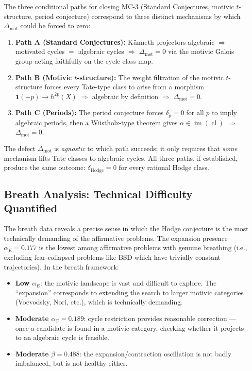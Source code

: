 \documentclass[11pt]{article}
\theoremstyle{definition}
\DeclareMathOperator{\cl}{cl}
\DeclareMathOperator{\im}{im}
\begin{document}
The three conditional paths for closing MC-3 (Standard Conjectures,
motivic $t$-structure, period conjecture) correspond to three distinct
mechanisms by which $\Delta_{\mathrm{mot}}$ could be forced to zero:

\begin{enumerate}
  \item \textbf{Path A (Standard Conjectures):} K\"unneth projectors
    algebraic $\Rightarrow$ motivated cycles $=$ algebraic cycles
    $\Rightarrow$ $\Delta_{\mathrm{mot}} = 0$ via the motivic Galois
    group acting faithfully on the cycle class map.

  \item \textbf{Path B (Motivic $t$-structure):} The weight filtration
    of the motivic $t$-structure forces every Tate-type class to arise
    from a morphism $\mathbf{1}(-p) \to h^{2p}(X)$ $\Rightarrow$
    algebraic by definition $\Rightarrow$ $\Delta_{\mathrm{mot}} = 0$.

  \item \textbf{Path C (Periods):} The period conjecture forces
    $\delta_p = 0$ for all $p$ to imply algebraic periods, then a
    W\"ustholz-type theorem gives $\alpha \in \im(\cl)$ $\Rightarrow$
    $\Delta_{\mathrm{mot}} = 0$.
\end{enumerate}

\noindent
The defect $\Delta_{\mathrm{mot}}$ is \emph{agnostic} to which path
succeeds; it only requires that \emph{some} mechanism lifts Tate classes
to algebraic cycles.  All three paths, if established, produce the same
outcome: $\delta_{\mathrm{Hodge}} = 0$ for every rational Hodge class.

\subsection{Breath Analysis: Technical Difficulty Quantified}

The breath data reveals a precise sense in which the Hodge conjecture is
the most technically demanding of the affirmative problems.  The expansion
presence $\alpha_E = 0.177$ is the lowest among affirmative problems with
genuine breathing (i.e., excluding fear-collapsed problems like BSD which
have trivially constant trajectories).  In the breath framework:
\begin{itemize}
  \item \textbf{Low $\alpha_E$}: the motivic landscape is vast and
    difficult to explore.  The ``expansion'' corresponds to extending
    the search to larger motivic categories (Voevodsky, Nori, etc.),
    which is technically demanding.
  \item \textbf{Moderate $\alpha_C = 0.189$}: cycle restriction provides
    reasonable correction --- once a candidate is found in a motivic
    category, checking whether it projects to an algebraic cycle is
    feasible.
  \item \textbf{Moderate $\beta = 0.488$}: the expansion/contraction
    oscillation is not badly imbalanced, but is not healthy either.
\end{itemize}
\end{document}
